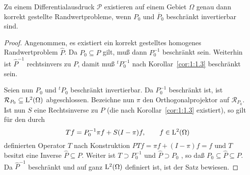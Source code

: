 \begin{thm}[Vi\v{s}ik, [{\cite[Theorem~1.2]{Hormander:1955}}]
Zu einem Differentialausdruck $\mathcal P$ existieren auf einem Gebiet $\Omega$ genau dann korrekt gestellte Randwertprobleme, wenn $P_0$ und $\overline P_0$
beschr\"ankt invertierbar sind.
\end{thm} 
\begin{proof} 
Angenommen, es existiert ein korrekt gestelltes homogenes Randwertproblem $\widehat P$. Da $P_0\subseteq \widehat P$ gilt, muß dann $P_0^{-1}$ beschränkt sein. Weiterhin ist $\widehat P^{-1}$ rechtsinvers zu $P$, damit muß ${}^t P_0^{-1}$ nach Korollar~\ref{cor:1:1.3} beschränkt sein.

Seien nun $P_0$ und ${}^t P_0$ beschränkt invertierbar. Da $P_0^{-1}$ beschr\"ankt ist, ist $\mathcal R_{P_0}\subseteq \mathrm L^2(\Omega)$ abgeschlossen.  Bezeichne nun $\pi$ den Orthogonalprojektor auf $\mathcal R_{P_0}$. Ist nun $S$ eine Rechtsinverse zu $P$ (die nach  Korollar~\ref{cor:1:1.3} existiert), so gilt für
den durch  
\begin{equation}
  Tf = P_0^{-1} \pi f + S(I-\pi) f,\qquad f\in\mathrm L^2(\Omega) 
\end{equation}
definierten Operator $T$ nach Konstruktion $PT f = \pi f + (I-\pi) f = f$ und $T$ besitzt eine Inverse $\widehat P \subseteq P$. Weiter ist $T\supset P_0^{-1}$ und $\widehat P\supset P_0$ , so daß $P_0\subseteq \widehat P\subseteq P$. Da $\widehat P^{-1}$ beschränkt und auf ganz $\mathrm L^2(\Omega)$ definiert ist, ist der Satz bewiesen.
\end{proof}


